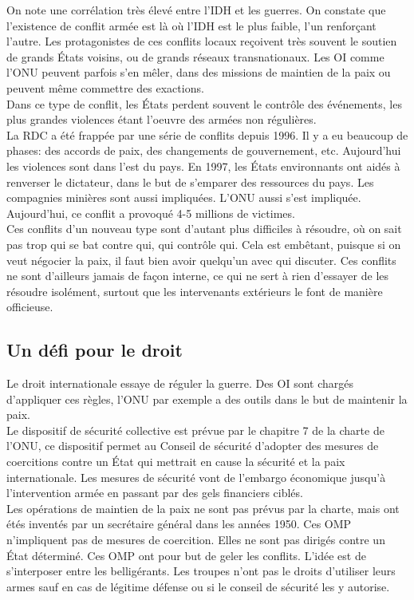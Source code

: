 \documentclass[10pt, a4paper, openany]{book}
\begin{document}
On note une corrélation très élevé entre l'IDH et les guerres. On constate que l'existence de conflit armée est là où l'IDH est le plus faible, l'un renforçant l'autre. Les protagonistes de ces conflits locaux reçoivent très souvent le soutien de grands États voisins, ou de grands réseaux transnationaux. Les OI comme l'ONU peuvent parfois s'en mêler, dans des missions de maintien de la paix ou peuvent même commettre des exactions. \\
Dans ce type de conflit, les États perdent souvent le contrôle des événements, les plus grandes violences étant l'oeuvre des armées non régulières. \\
La RDC a été frappée par une série de conflits depuis 1996. Il y a eu beaucoup de phases: des accords de paix, des changements de gouvernement, etc. Aujourd'hui les violences sont dans l'est du pays. En 1997, les États environnants ont aidés à renverser le dictateur, dans le but de s'emparer des ressources du pays. Les compagnies minières sont aussi impliquées. L'ONU aussi s'est impliquée. Aujourd'hui, ce conflit a provoqué 4-5 millions de victimes. \\
Ces conflits d'un nouveau type sont d'autant plus difficiles à résoudre, où on sait pas trop qui se bat contre qui, qui contrôle qui. Cela est embêtant, puisque si on veut négocier la paix, il faut bien avoir quelqu'un avec qui discuter. Ces conflits ne sont d'ailleurs jamais de façon interne, ce qui ne sert à rien d'essayer de les résoudre isolément, surtout que les intervenants extérieurs le font de manière officieuse. 

\subsection{Un défi pour le droit}

Le droit internationale essaye de réguler la guerre. Des OI sont chargés d'appliquer ces règles, l'ONU par exemple a des outils dans le but de maintenir la paix. \\
Le dispositif de sécurité collective est prévue par le chapitre 7 de la charte de l'ONU, ce dispositif permet au Conseil de sécurité d'adopter des mesures de coercitions contre un État qui mettrait en cause la sécurité et la paix internationale. Les mesures de sécurité vont de l'embargo économique jusqu'à l'intervention armée en passant par des gels financiers ciblés. \\
Les opérations de maintien de la paix ne sont pas prévus par la charte, mais ont étés inventés par un secrétaire général dans les années 1950. Ces OMP n'impliquent pas de mesures de coercition. Elles ne sont pas dirigés contre un État déterminé. Ces OMP ont pour but de geler les conflits. L'idée est de s'interposer entre les belligérants. Les troupes n'ont pas le droits d'utiliser leurs armes sauf en cas de légitime défense ou si le conseil de sécurité les y autorise. 
\end{document}
